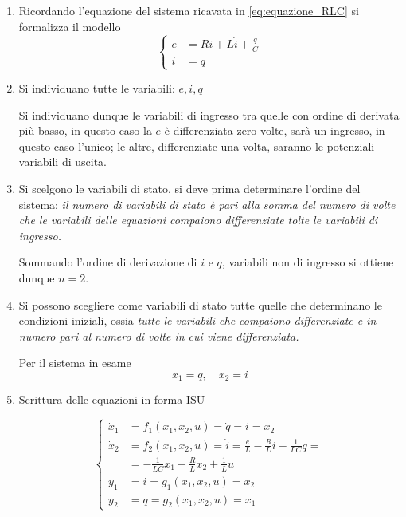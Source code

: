 \begin{enumerate}
\item Ricordando l'equazione del sistema ricavata in \ref{eq:equazione_RLC}
si formalizza il modello
\begin{equation}\left\{
\begin{aligned}
 e &= R i + L\dot{i} + \frac{q}{C}\\
 i &= \dot{q}
\end{aligned}\right.\end{equation}
\item Si individuano tutte le variabili: $e,i,q$

Si individuano dunque le variabili di ingresso tra quelle con ordine di derivata più basso, in
questo caso la $e$ è differenziata zero volte, sarà un ingresso, in questo caso l'unico; le altre,
differenziate una volta, saranno le potenziali variabili di uscita.
\item Si scelgono le variabili di stato, si deve prima determinare l'ordine del sistema:\newline
\emph{il
numero di variabili di stato è pari alla somma del numero di volte che le variabili delle equazioni
compaiono differenziate tolte le variabili di ingresso.}

Sommando l'ordine di derivazione di $i$ e $q$, variabili non di ingresso si ottiene dunque $n=2$.

\item Si possono scegliere come variabili di stato tutte quelle che determinano le condizioni
iniziali, ossia\newline
\emph{tutte le variabili che compaiono differenziate e in numero pari al numero di volte
in cui viene differenziata.}

Per il sistema in esame
$$
x_1 = q,\quad x_2 = i
$$
\item Scrittura delle equazioni in forma ISU

$$
\left\{\begin{aligned}
\dot{x}_1 &= f_1\left(x_1,x_2,u\right) = \dot{q} = i = x_2\\
\dot{x}_2 &=f_2(x_1,x_2,u) = \dot{i} = \frac{e}{L} - \frac{R}{L}i-\frac{1}{LC}q =\\
&= -\frac{1}{LC}x_1 - \frac{R}{L}x_2 + \frac{1}{L}u\\
y_1 &= i = g_1(x_1,x_2,u)=x_2\\
y_2 &=q = g_2(x_1,x_2,u)=x_1
\end{aligned}\right.
$$
\end{enumerate}

